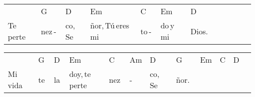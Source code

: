 \begin{multicols}{2}
\noindent
\begin{minipage}{\columnwidth}
\noindent
\noindent
\begin{tabular}{llllllllllll}
&G&D&Em&C&Em&D\\
Te\,perte&nez\,-\,&co,\,Se&ñor,\,Tú\,eres\,mi\,&to\,-\,&do\,y\,mi\,&Dios.
\end{tabular}

\noindent
\begin{tabular}{llllllllllll}
&G&D&Em&C&Am&D&G&Em&C&D\\
Mi\,vida\,&te\,&la\,&doy,\,te\,perte&nez\,&-\,&co,\,\,\,Se&ñor.\,\,&\,\,\,&\,\,\,&
\end{tabular}
\end{minipage}\\

\end{multicols}